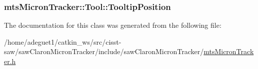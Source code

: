 \hypertarget{classmts_micron_tracker_1_1_tool_a053af3e76832fc8cf0df4dc188e0ce8f}{
\subsubsection[{Tooltip\-Position}]{ mts\-Micron\-Tracker\-::\-Tool\-::\-Tooltip\-Position}}\label{classmts_micron_tracker_1_1_tool_a053af3e76832fc8cf0df4dc188e0ce8f}


The documentation for this class was generated from the following file\-:\begin{DoxyCompactItemize}
\item 
/home/adeguet1/catkin\-\_\-ws/src/cisst-\/saw/saw\-Claron\-Micron\-Tracker/include/saw\-Claron\-Micron\-Tracker/\hyperlink{mts_micron_tracker_8h}{mts\-Micron\-Tracker.\-h}\end{DoxyCompactItemize}
